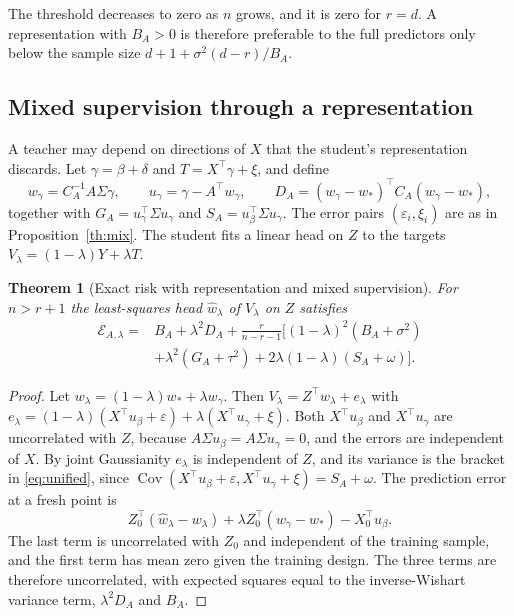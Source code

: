 \documentclass[11pt]{article}
\newtheorem{theorem}{Theorem}[section]
\theoremstyle{remark}
\newcommand{\Cov}{\operatorname{Cov}}
\newcommand{\1}{\mathbf 1}
\begin{document}
The threshold decreases to zero as $n$ grows, and it is zero for $r=d$. A representation with $B_A>0$ is therefore preferable to the full predictors only below the sample size $d+1+\sigma^2(d-r)/B_A$.

\subsection{Mixed supervision through a representation}
A teacher may depend on directions of $X$ that the student's representation discards. Let $\gamma=\beta+\delta$ and $T=X^\top\gamma+\xi$, and define
\begin{equation}
 w_\gamma=C_A^{-1}A\Sigma\gamma,\qquad
 u_\gamma=\gamma-A^\top w_\gamma,
 \qquad D_A=(w_\gamma-w_*)^\top C_A(w_\gamma-w_*),
\end{equation}
together with $G_A=u_\gamma^\top\Sigma u_\gamma$ and $S_A=u_\beta^\top\Sigma u_\gamma$. The error pairs $(\varepsilon_i,\xi_i)$ are as in Proposition~\ref{th:mix}. The student fits a linear head on $Z$ to the targets $V_\lambda=(1-\lambda)Y+\lambda T$.

\begin{theorem}[Exact risk with representation and mixed supervision]\label{th:unified}
For $n>r+1$ the least-squares head $\widehat w_\lambda$ of $V_\lambda$ on $Z$ satisfies
\begin{equation}\label{eq:unified}
\begin{aligned}
\mathcal E_{A,\lambda}={}& B_A+\lambda^2D_A+\frac{r}{n-r-1}\Big[ (1-\lambda)^2(B_A+\sigma^2) \\
 &+\lambda^2(G_A+\tau^2)+2\lambda(1-\lambda)(S_A+\omega)\Big].
\end{aligned}
\end{equation}
\end{theorem}
\begin{proof}
Let $w_\lambda=(1-\lambda)w_*+\lambda w_\gamma$. Then $V_\lambda=Z^\top w_\lambda+e_\lambda$ with
$e_\lambda=(1-\lambda)(X^\top u_\beta+\varepsilon)+\lambda(X^\top u_\gamma+\xi)$.
Both $X^\top u_\beta$ and $X^\top u_\gamma$ are uncorrelated with $Z$, because $A\Sigma u_\beta=A\Sigma u_\gamma=0$, and the errors are independent of $X$. By joint Gaussianity $e_\lambda$ is independent of $Z$, and its variance is the bracket in \eqref{eq:unified}, since $\Cov(X^\top u_\beta+\varepsilon,X^\top u_\gamma+\xi)=S_A+\omega$. The prediction error at a fresh point is
\[
Z_0^\top(\widehat w_\lambda-w_\lambda)+\lambda Z_0^\top(w_\gamma-w_*)-X_0^\top u_\beta .
\]
The last term is uncorrelated with $Z_0$ and independent of the training sample, and the first term has mean zero given the training design. The three terms are therefore uncorrelated, with expected squares equal to the inverse-Wishart variance term, $\lambda^2D_A$ and $B_A$.
\end{proof}
\end{document}
